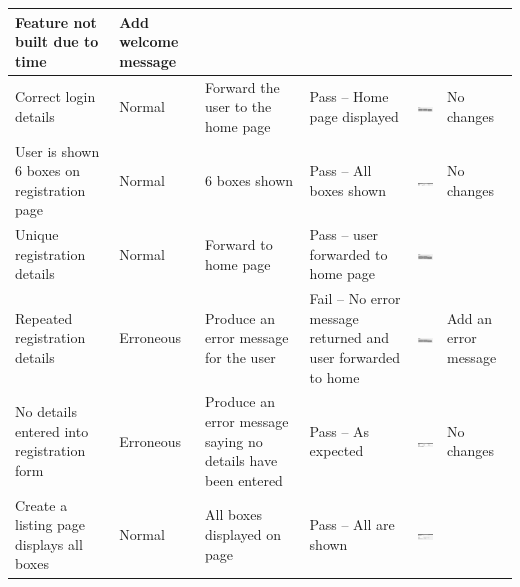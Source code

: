 \begin{center}
\begin{longtable}{|P{17mm}|P{17mm}|P{16mm}|P{17mm}|P{40mm}|P{21.5mm}|}
Feature not built due to time & Add welcome message \\ \hline
Correct login details & Normal & Forward the user to the home page &
Pass -- Home page displayed &
\includegraphics[width=38mm]{ch3_developing/proto2/media/image5.png} &
No changes \\ \hline
User is shown 6 boxes on registration page & Normal & 6 boxes shown &
Pass -- All boxes shown &
\includegraphics[width=38mm]{ch3_developing/proto2/media/image6.png} &
No changes \\ \hline
Unique registration details & Normal & Forward to home page & Pass --
user forwarded to home page &
\includegraphics[width=38mm]{ch3_developing/proto2/media/image4.png}
& \\ \hline
Repeated registration details & Erroneous & Produce an error message for
the user & Fail -- No error message returned and user forwarded to home
& \includegraphics[width=38mm]{ch3_developing/proto2/media/image4.png}
& Add an error message \\ \hline
No details entered into registration form & Erroneous & Produce an error
message saying no details have been entered & Pass -- As expected &
\includegraphics[width=38mm]{ch3_developing/proto2/media/image7.png} &
No changes \\ \hline
Create a listing page displays all boxes & Normal & All boxes displayed
on page & Pass -- All are shown &
\includegraphics[width=38mm]{ch3_developing/proto2/media/image8.png} &

\end{longtable}
\end{center}
